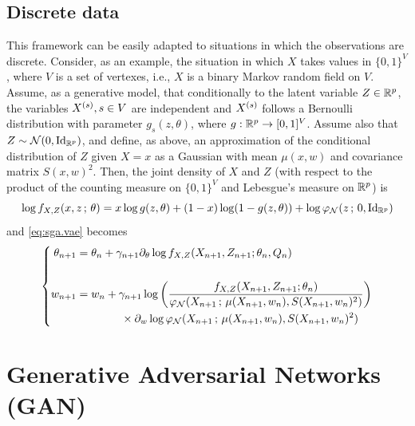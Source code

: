 \subsection{Discrete data}
This framework can be easily adapted to situations in which the observations are discrete. Consider, as an example, the situation in which $X$ takes values in $\{0,1\}^V$, where $V$ is a set of vertexes, i.e., $X$ is a binary Markov random field on $V$. Assume, as a generative model, that  conditionally to the latent variable $Z\in {\mathbb{R}}^p$, the variables $X^{(s)}, s\in V$ are independent and $X^{(s)}$ follows a Bernoulli distribution with parameter $g_s(z, \theta)$, where $g: {\mathbb{R}}^p \to [0,1]^V$. Assume also that $Z \sim \CN(0, \Id[p])$, and define, as above, an approximation of the conditional distribution of $Z$ given $X=x$ as a Gaussian with mean $\mu(x,w)$ and covariance matrix $S(x, w)^2$. Then, the joint density of $X$ and $Z$ (with respect to the product of the counting measure on $\{0,1\}^V$ and Lebesgue's measure on ${\mathbb{R}}^p$) is
\[
\log f_{X,Z}(x,z\,;\,\theta) = x \log g(z, \theta)+ (1-x)\log(1-g(z,\theta)) + \log \phi_\CN(z\,;\, 0, \Id[p])
\]
and \cref{eq:sga.vae} becomes
\begin{equation}
\label{eq:sga.vae.disc}
\left\{
\begin{aligned}
\theta_{n+1} &= \theta_n +\gamma_{n+1} \partial_\theta \log f_{X,Z}(X_{n+1},Z_{n+1};\theta_n, Q_n)
\\
\\
w_{n+1} &= w_n + \gamma_{n+1} \log \left( \frac{f_{X,Z}(X_{n+1},Z_{n+1};\theta_n)}{\varphi_{\mathcal N}(X_{n+1}\,;\, \mu(X_{n+1}, w_n), S(X_{n+1}, w_n)^2)}\right) \\
& \qquad\qquad \times \partial_w \log \varphi_{\mathcal N}(X_{n+1}\,;\, \mu(X_{n+1}, w_n), S(X_{n+1}, w_n)^2)
\end{aligned}
\right.
\end{equation}



\section{Generative Adversarial Networks (GAN)}
\label{sec:gan}

